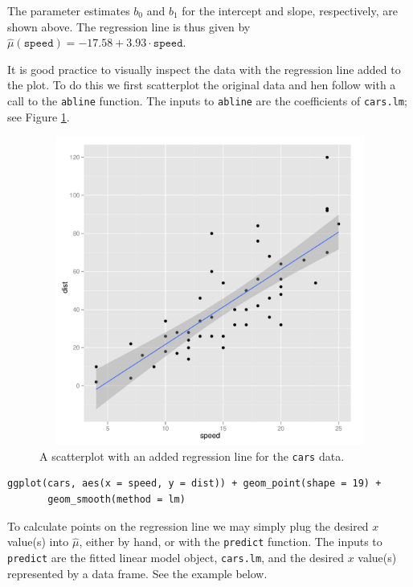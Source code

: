 \documentclass[captions=tableheading]{scrbook}
\begin{document}
The parameter estimates \( b_{0} \) and \( b_{1} \) for the intercept and slope, respectively, are shown above. The regression line is thus given by \( \hat{\mu}(\mathtt{speed}) =  -17.58 +  3.93 \cdot \mathtt{speed} \).

It is good practice to visually inspect the data with the regression line added to the plot. To do this we first scatterplot the original data and hen follow with a call to the \texttt{abline} function. The inputs to \texttt{abline} are the coefficients of \texttt{cars.lm}; see Figure \ref{fig:Scatter-cars-regline}.

\begin{figure}[th]
  \includegraphics[width=5in, height=4in]{img/carline.pdf}
  \caption[Scatterplot with added regression line for the \texttt{cars} data]{\small A scatterplot with an added regression line for the \texttt{cars} data.}
  \label{fig:Scatter-cars-regline}
\end{figure}


\begin{verbatim}
ggplot(cars, aes(x = speed, y = dist)) + geom_point(shape = 19) + 
       geom_smooth(method = lm)
\end{verbatim}

To calculate points on the regression line we may simply plug the desired \(x\) value(s) into \( \hat{\mu} \), either by hand, or with the \texttt{predict} function. The inputs to \texttt{predict} are the fitted linear model object, \texttt{cars.lm}, and the desired \(x\) value(s) represented by a data frame. See the example below.
\end{document}
